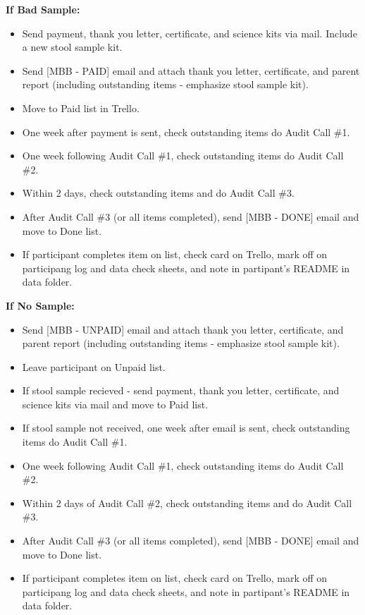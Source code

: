 \documentclass[]{book}
\providecommand{\tightlist}{%
  \setlength{\itemsep}{0pt}\setlength{\parskip}{0pt}}
\begin{document}
\textbf{If Bad Sample:}

\begin{itemize}
\tightlist
\item
  Send payment, thank you letter, certificate, and science kits via mail. Include a new stool sample kit.
\item
  Send {[}MBB - PAID{]} email and attach thank you letter, certificate, and parent report (including outstanding items - emphasize stool sample kit).
\item
  Move to Paid list in Trello.
\item
  One week after payment is sent, check outstanding items do Audit Call \#1.
\item
  One week following Audit Call \#1, check outstanding items do Audit Call \#2.
\item
  Within 2 days, check outstanding items and do Audit Call \#3.
\item
  After Audit Call \#3 (or all items completed), send {[}MBB - DONE{]} email and move to Done list.
\item
  If participant completes item on list, check card on Trello, mark off on participang log and data check sheets, and note in partipant's README in data folder.
\end{itemize}

\textbf{If No Sample:}

\begin{itemize}
\tightlist
\item
  Send {[}MBB - UNPAID{]} email and attach thank you letter, certificate, and parent report (including outstanding items - emphasize stool sample kit).
\item
  Leave participant on Unpaid list.
\item
  If stool sample recieved - send payment, thank you letter, certificate, and science kits via mail and move to Paid list.
\item
  If stool sample not received, one week after email is sent, check outstanding items do Audit Call \#1.
\item
  One week following Audit Call \#1, check outstanding items do Audit Call \#2.
\item
  Within 2 days of Audit Call \#2, check outstanding items and do Audit Call \#3.
\item
  After Audit Call \#3 (or all items completed), send {[}MBB - DONE{]} email and move to Done list.
\item
  If participant completes item on list, check card on Trello, mark off on participang log and data check sheets, and note in partipant's README in data folder.
\end{itemize}
\end{document}
